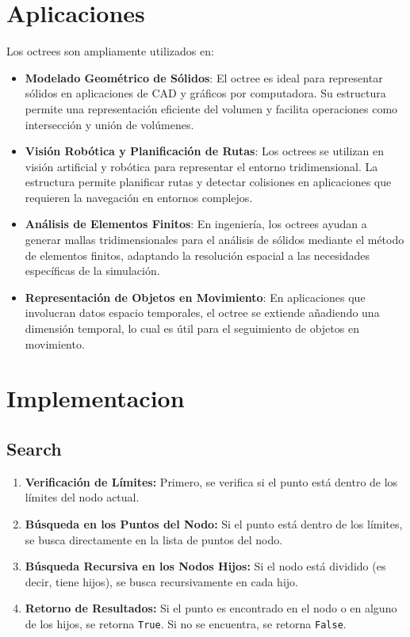 \documentclass{article}
\begin{document}
\section{Aplicaciones}
Los octrees son ampliamente utilizados en:
\begin{itemize}
    \item \textbf{Modelado Geométrico de Sólidos}: El octree es ideal para representar sólidos en aplicaciones de CAD y gráficos por computadora. Su estructura permite una representación eficiente del volumen y facilita operaciones como intersección y unión de volúmenes.
    \item \textbf{Visión Robótica y Planificación de Rutas}: Los octrees se utilizan en visión artificial y robótica para representar el entorno tridimensional. La estructura permite planificar rutas y detectar colisiones en aplicaciones que requieren la navegación en entornos complejos.
    \item \textbf{Análisis de Elementos Finitos}: En ingeniería, los octrees ayudan a generar mallas tridimensionales para el análisis de sólidos mediante el método de elementos finitos, adaptando la resolución espacial a las necesidades específicas de la simulación.
    \item \textbf{Representación de Objetos en Movimiento}: En aplicaciones que involucran datos espacio temporales, el octree se extiende añadiendo una dimensión temporal, lo cual es útil para el seguimiento de objetos en movimiento.
\end{itemize}
\section{Implementacion}
\subsection{Search}
\begin{enumerate}
    \item \textbf{Verificación de Límites:} Primero, se verifica si el punto está dentro de los límites del nodo actual.
    
    
    \item \textbf{Búsqueda en los Puntos del Nodo:} Si el punto está dentro de los límites, se busca directamente en la lista de puntos del nodo.\\
    
    
    \item \textbf{Búsqueda Recursiva en los Nodos Hijos:} Si el nodo está dividido (es decir, tiene hijos), se busca recursivamente en cada hijo.\\
    
    
    \item \textbf{Retorno de Resultados:} Si el punto es encontrado en el nodo o en alguno de los hijos, se retorna \texttt{True}. Si no se encuentra, se retorna \texttt{False}.
    
\end{enumerate}
\end{document}
